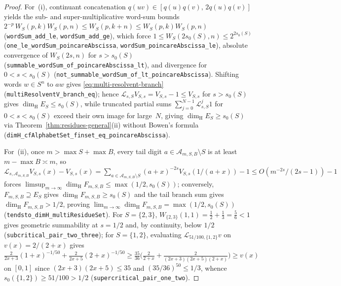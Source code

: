 \documentclass[11pt]{article}
\theoremstyle{definition}
\theoremstyle{remark}
\newcommand{\dimH}{\dim_{\mathrm{H}}}
\begin{document}
\begin{proof}
For~(i), continuant concatenation $q(uv)\in[q(u)q(v),\,2q(u)q(v)]$ yields
the sub- and super-multiplicative word-sum bounds
$2^{-p}\,W_S(p,k)W_S(p,n)\le W_S(p,k+n)\le W_S(p,k)W_S(p,n)$
(\texttt{wordSum\_\allowbreak add\_\allowbreak le},
\texttt{wordSum\_\allowbreak add\_\allowbreak ge}), which force
$1\le W_S(2s_0(S),n)\le 2^{2s_0(S)}$ (\texttt{one\_\allowbreak le\_\allowbreak wordSum\_\allowbreak poincareAbscissa},
\texttt{wordSum\_\allowbreak poincareAbscissa\_\allowbreak le}), absolute
convergence of $W_S(2s,n)$ for $s>s_0(S)$
(\texttt{summable\_\allowbreak wordSum\_\allowbreak of\_\allowbreak poincareAbscissa\_\allowbreak lt}),
and divergence for $0<s<s_0(S)$
(\texttt{not\_\allowbreak summable\_\allowbreak wordSum\_\allowbreak of\_\allowbreak lt\_\allowbreak poincareAbscissa}).
Shifting words $w\in S^n$ to $aw$ gives \eqref{eq:multi-resolvent-branch}
(\texttt{multiResolventV\_\allowbreak branch\_\allowbreak eq}); hence
$\mathcal L_{s,S}V_{S,s}=V_{S,s}-1\le V_{S,s}$ for $s>s_0(S)$ gives
$\dimH E_S\le s_0(S)$, while truncated partial sums
$\sum_{j=0}^{N-1}\mathcal L_{s,S}^j 1$ for $0<s<s_0(S)$ exceed their own image
for large~$N$, giving $\dimH E_S\ge s_0(S)$ via
Theorem~\ref{thm:residues-general}(ii) without Bowen's formula
(\texttt{dimH\_\allowbreak cfAlphabetSet\_\allowbreak finset\_\allowbreak eq\_\allowbreak poincareAbscissa}).

For~(ii), once $m>\max S+\max B$, every tail digit
$a\in\mathcal A_{m,S,B}\setminus S$ is at least $m-\max B\asymp m$, so
$\mathcal L_{s,\mathcal A_{m,S,B}}V_{S,s}(x)-V_{S,s}(x)
=\sum_{a\in\mathcal A_{m,S,B}\setminus S}(a+x)^{-2s}V_{S,s}(1/(a+x))-1
\le O(m^{-2s}/(2s-1))-1$ forces $\limsup_{m\to\infty}\dimH F_{m,S,B}\le \max(1/2,s_0(S))$;
conversely, $F_{m,S,B}\supseteq E_S$ gives $\dimH F_{m,S,B}\ge s_0(S)$ and the
tail branch sum gives $\dimH F_{m,S,B}>1/2$, proving
$\lim_{m\to\infty}\dimH F_{m,S,B}=\max(1/2,s_0(S))$
(\texttt{tendsto\_\allowbreak dimH\_\allowbreak multiResidueSet}).
For $S=\{2,3\}$, $W_{\{2,3\}}(1,1)=\frac12+\frac13=\frac56<1$ gives geometric
summability at $s=1/2$ and, by continuity, below $1/2$
(\texttt{subcritical\_\allowbreak pair\_\allowbreak two\_\allowbreak three}); for $S=\{1,2\}$, evaluating
$\mathcal L_{51/100,\{1,2\}}v$ on $v(x)=2/(2+x)$ gives
$\frac{2}{2x+3}(1+x)^{-1/50}+\frac{2}{2x+5}(2+x)^{-1/50}\ge\frac{35}{36}\bigl(\frac{2}{2+x}+\frac{2}{(2x+3)(2x+5)(2+x)}\bigr)\ge v(x)$
on $[0,1]$ since $(2x+3)(2x+5)\le35$ and $(35/36)^{50}\le1/3$, whence
$s_0(\{1,2\})\ge 51/100>1/2$
(\texttt{supercritical\_\allowbreak pair\_\allowbreak one\_\allowbreak two}).


\end{proof}
\end{document}
